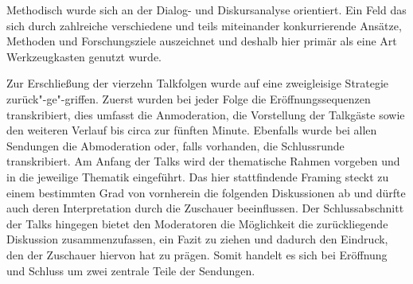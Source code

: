 \begin{table}[htb]\label{tab:qualdaten2}
	\caption{Sample 2 für die Einzelanalyse}
	\centering
\end{table}

Methodisch wurde sich an der Dialog- und Diskursanalyse orientiert. Ein Feld das sich  durch zahlreiche verschiedene und teils miteinander konkurrierende Ansätze, Methoden und Forschungsziele auszeichnet \parencites[für einen Überblick siehe][]{geeRoutledgeHandbookDiscourse2012}[bzw. für die Dialoganalyse:][]{biereVerstehenUndBeschreiben1994}{hundsnurscherDialoganalyseReferateArbeitstagung1986}{hundsnurscherDialoganalyseIIReferate1989}{statiDialoganalyseIIIReferate1991} und deshalb hier primär als eine Art Werkzeugkasten genutzt wurde.

Zur Erschließung der vierzehn Talkfolgen wurde auf eine zweigleisige Strategie zurück"-ge"-griffen. Zuerst wurden bei jeder Folge die Eröffnungssequenzen transkribiert, dies umfasst die Anmoderation, die Vorstellung der Talkgäste sowie den weiteren Verlauf bis circa zur fünften Minute. Ebenfalls wurde bei allen Sendungen die Abmoderation oder, falls vorhanden, die Schlussrunde transkribiert. Am Anfang der Talks wird der thematische Rahmen vorgeben und in die jeweilige Thematik eingeführt. Das hier stattfindende Framing steckt zu einem bestimmten Grad von vornherein die folgenden Diskussionen ab und dürfte auch deren Interpretation durch die Zuschauer beeinflussen. Der Schlussabschnitt der Talks hingegen bietet den Moderatoren die Möglichkeit die zurückliegende Diskussion zusammenzufassen, ein Fazit zu ziehen und dadurch den Eindruck, den der Zuschauer hiervon hat zu prägen. Somit handelt es sich bei Eröffnung und Schluss um zwei zentrale Teile der Sendungen.


